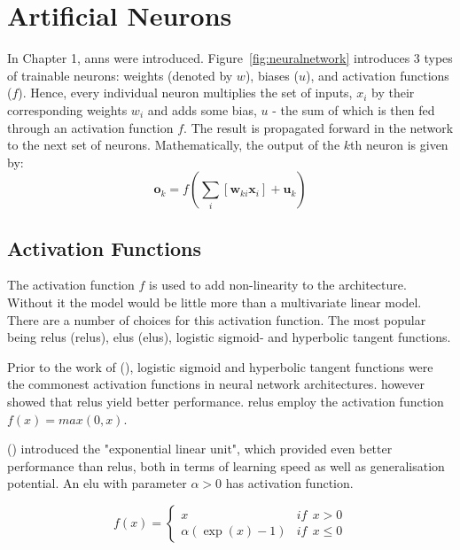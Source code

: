 \documentclass[11pt,oneside,openany,a4paper,english, report, goldenblock
]{usthesis}
\begin{document}
\section{Artificial Neurons}

In Chapter 1, \acrshort{ann}s were introduced. Figure~\ref{fig:neuralnetwork} introduces 3 types of trainable neurons: weights (denoted by $w$), biases ($u$), and activation functions ($f$). Hence, every individual neuron multiplies the set of inputs, $x_i$ by their corresponding weights $w_i$ and adds some bias, $u$ - the sum of which is then fed through an activation function $f$. The result is propagated forward in the network to the next set of neurons. Mathematically, the output of the $k$th neuron is given by:
\begin{equation}
\mathbf{o}_k = f\left(\sum_i \left[ \mathbf{w}_{ki} \mathbf{x}_i \right] + \mathbf{u}_k\right)
\end{equation}

\subsection{Activation Functions}
The activation function $f$ is used to add non-linearity to the architecture. Without it the model would be little more than a multivariate linear model. There are a number of choices for this activation function. The most popular being \acrlong{relu}s (\acrshort{relu}s), \acrlong{elu}s (\acrshort{elu}s), logistic sigmoid- and hyperbolic tangent functions.

Prior to the work of  (\citeyear{glorot2011deep}), logistic sigmoid and hyperbolic tangent functions were the commonest activation functions in neural network architectures. \citet{glorot2011deep} however showed that \acrshort{relu}s yield better performance. \acrshort{relu}s employ the activation function $f\left(x\right) = max\left(0, x\right)$.

 (\citeyear{DBLP:journals/corr/ClevertUH15}) introduced the "exponential linear unit", which provided even better performance than \acrshort{relu}s, both in terms of learning speed as well as generalisation potential. An \acrshort{elu} with parameter $\alpha > 0$ has activation function.

\begin{equation}
f\left(x\right)=\left\{\begin{matrix}
x & if\ \ x > 0\\ 
\alpha \left( \exp\left(x \right ) -1\right ) & if\ \ x \leq 0
\end{matrix}\right.
\end{equation}
\end{document}
